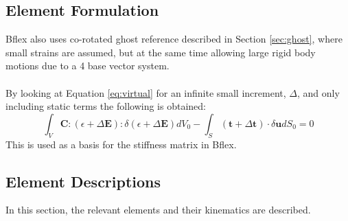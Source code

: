 \subsection{Element Formulation}
Bflex also uses co-rotated ghost reference described in Section \ref{sec:ghost}, 
where small strains are assumed, but at the same time allowing large rigid body motions due to a 4 base vector system. \\\\By looking at Equation \ref{eq:virtual} for an infinite small increment, $\Delta$, and only including static terms the following is obtained: 
 \begin{equation}
    \int_V \boldsymbol{C}: (\epsilon + \Delta \boldsymbol{E}) : \delta (\epsilon + \Delta \boldsymbol{E})dV_0 - \int_S (\boldsymbol{t} + \Delta \boldsymbol{t}) \cdot \delta \boldsymbol{u} dS_0 =0
\end{equation}
 This is used as a basis for the stiffness matrix in Bflex.
 

\subsection{Element Descriptions}
\label{sec:el}
In this section, the relevant elements and their kinematics are described.

